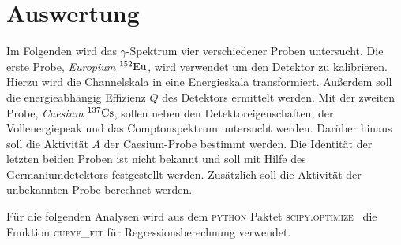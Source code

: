 \section{Auswertung}
Im Folgenden wird das $\gamma$-Spektrum vier verschiedener Proben untersucht.
Die erste Probe, \emph{Europium} $^{152}\ce{Eu}$, wird verwendet um den Detektor
zu kalibrieren. Hierzu wird die Channelskala in eine Energieskala transformiert.
Außerdem soll die energieabhängig Effizienz $Q$ des Detektors ermittelt werden.
Mit der zweiten Probe, \emph{Caesium} $^{137}\ce{Cs}$, sollen neben den
Detektoreigenschaften, der Vollenergiepeak und das Comptonspektrum untersucht werden.
Darüber hinaus soll die Aktivität $A$ der Caesium-Probe bestimmt werden.
Die Identität der letzten beiden Proben ist nicht bekannt und soll mit Hilfe
des Germaniumdetektors festgestellt werden. Zusätzlich soll die Aktivität
der unbekannten Probe berechnet werden.

Für die folgenden Analysen wird aus dem \textsc{python} Paktet \textsc{scipy.optimize}~\cite{scipy}
die Funktion \textsc{curve\_{fit}} für Regressionsberechnung verwendet.

